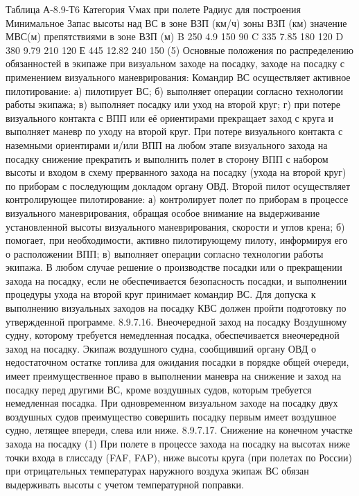 	                                                                                                                             Таблица А-8.9-Т6
Категория	Vмах при полете	Радиус для построения	Минимальное	Запас высоты над
ВС	в зоне ВЗП (км/ч)	зоны ВЗП (км)		значение МВС(м)	препятствиями в зоне ВЗП (м)
B	250	4.9		150	90
C	335	7.85		180	120
D	380	9.79		210	120
Е	445	12.82		240	150
(5) Основные положения по распределению обязанностей в экипаже при визуальном заходе на посадку, заходе на посадку с применением визуального маневрирования:
Командир ВС осуществляет активное пилотирование:
а)	пилотирует ВС;
б)	выполняет операции согласно технологии работы экипажа;
в)	выполняет посадку или уход на второй круг;
г)	при потере визуального контакта с ВПП или её ориентирами прекращает заход с круга и выполняет маневр по уходу на второй круг.
При потере визуального контакта с наземными ориентирами и/или ВПП на любом этапе визуального захода на посадку снижение прекратить и выполнить полет в сторону ВПП с набором высоты и входом в схему прерванного захода на посадку (ухода на второй круг) по приборам с последующим докладом органу ОВД.
Второй пилот осуществляет контролирующее пилотирование:
а)	контролирует полет по приборам в процессе визуального маневрирования, обращая особое внимание на выдерживание установленной высоты визуального маневрирования, скорости и углов крена;
б)	помогает, при необходимости, активно пилотирующему пилоту, информируя его о расположении ВПП;
в)	выполняет операции согласно технологии работы экипажа.
В любом случае решение о производстве посадки или о прекращении захода на посадку, если не обеспечивается безопасность посадки, и выполнении процедуры ухода на второй круг принимает командир ВС.
Для допуска к выполнению визуальных заходов на посадку КВС должен пройти подготовку по утвержденной программе.
8.9.7.16.	Внеочередной заход на посадку
Воздушному судну, которому требуется немедленная посадка, обеспечивается внеочередной заход на посадку. 
Экипаж воздушного судна, сообщивший органу ОВД о недостаточном остатке топлива для ожидания посадки в порядке общей очереди, имеет преимущественное право в выполнении маневра на снижение и заход на посадку перед другими ВС, кроме воздушных судов, которым требуется немедленная посадка. 
При одновременном визуальном заходе на посадку двух воздушных судов преимущество совершить посадку первым имеет воздушное судно, летящее впереди, слева или ниже.
8.9.7.17.	Снижение на конечном участке захода на посадку
(1) При полете в процессе захода на посадку на высотах ниже точки входа в глиссаду (FAF, FAP), ниже высоты круга (при полетах по России) при отрицательных температурах наружного воздуха экипаж ВС обязан выдерживать высоты с учетом температурной поправки.

